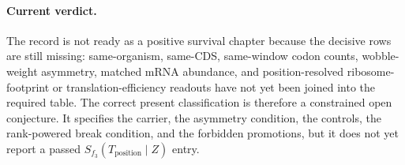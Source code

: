 \paragraph{Current verdict.}
The record is not ready as a positive survival chapter because the decisive rows are still missing: same-organism, same-CDS, same-window codon counts, wobble-weight asymmetry, matched mRNA abundance, and position-resolved ribosome-footprint or translation-efficiency readouts have not yet been joined into the required table.  The correct present classification is therefore a constrained open conjecture.  It specifies the carrier, the asymmetry condition, the controls, the rank-powered break condition, and the forbidden promotions, but it does not yet report a passed $S_{f_3}(T_{\mathrm{position}}\mid Z)$ entry.
